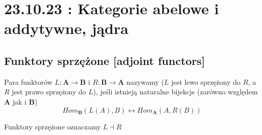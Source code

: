 \section{23.10.23 : Kategorie abelowe i addytywne, jądra}

\subsection{Funktory sprzężone [adjoint functors]}


\begin{definition}
  Para funktorów $L:\mathbf{A}\to\mathbf{B}$ i $R:\mathbf{B}\to\mathbf{A}$ nazywamy  ($L$ jest lewo sprzężony do $R$, a $R$ jest prawo sprzężony do $L$), jeśli istnieją naturalne bijekcje (zarówno względem $\mathbf{A}$ jak i $\mathbf{B}$)
  $$Hom_{\mathbf{B}}(L(A),B)\longleftrightarrow Hom_{\mathbf{A}}(A,R(B))$$

  Funktory sprzężone oznaczamy $L\dashv R$
\end{definition}

